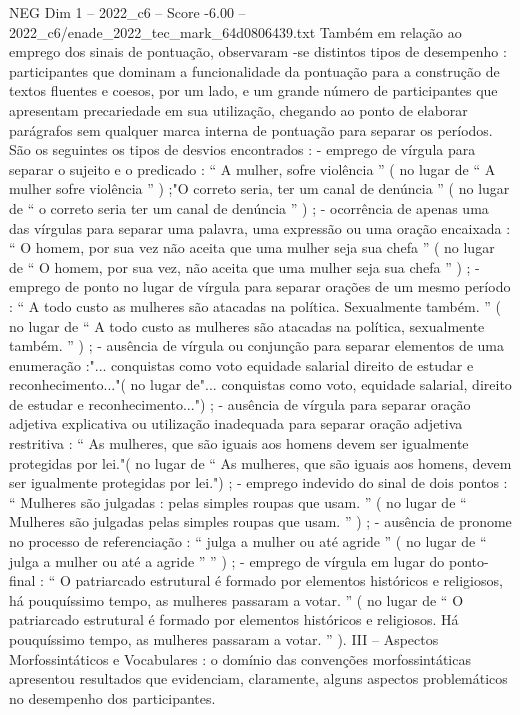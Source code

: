 \begin{textsample}{NEG Dim 1 – 2022\_c6 – Score -6.00 – 2022\_c6/enade\_2022\_tec\_mark\_64d0806439.txt}
Também em relação ao emprego dos sinais de pontuação, observaram -se distintos tipos de desempenho : participantes que dominam a funcionalidade da pontuação para a construção de textos fluentes e coesos, por um lado, e um grande número de participantes que apresentam precariedade em sua utilização, chegando ao ponto de elaborar parágrafos sem qualquer marca interna de pontuação para separar os períodos.
São os seguintes os tipos de desvios encontrados : - emprego de vírgula para separar o sujeito e o predicado : “ A mulher, sofre violência ” ( no lugar de “ A mulher sofre violência ” ) ;"O correto seria, ter um canal de denúncia ” ( no lugar de “ o correto seria ter um canal de denúncia ” ) ; - ocorrência de apenas uma das vírgulas para separar uma palavra, uma expressão ou uma oração encaixada : “ O homem, por sua vez não aceita que uma mulher seja sua chefa ” ( no lugar de “ O homem, por sua vez, não aceita que uma mulher seja sua chefa ” ) ; - emprego de ponto no lugar de vírgula para separar orações de um mesmo período : “ A todo custo as mulheres são atacadas na política.
Sexualmente também. ” ( no lugar de “ A todo custo as mulheres são atacadas na política, sexualmente também. ” ) ; - ausência de vírgula ou conjunção para separar elementos de uma enumeração :"... conquistas como voto equidade salarial direito de estudar e reconhecimento..."( no lugar de"... conquistas como voto, equidade salarial, direito de estudar e reconhecimento...") ; - ausência de vírgula para separar oração adjetiva explicativa ou utilização inadequada para separar oração adjetiva restritiva : “ As mulheres, que são iguais aos homens devem ser igualmente protegidas por lei."( no lugar de “ As mulheres, que são iguais aos homens, devem ser igualmente protegidas por lei.") ; - emprego indevido do sinal de dois pontos : “ Mulheres são julgadas : pelas simples roupas que usam. ” ( no lugar de “ Mulheres são julgadas pelas simples roupas que usam. ” ) ; - ausência de pronome no processo de referenciação : “ julga a mulher ou até agride ” ( no lugar de “ julga a mulher ou até a agride ” ” ) ; - emprego de vírgula em lugar do ponto-final : “ O patriarcado estrutural é formado por elementos históricos e religiosos, há pouquíssimo tempo, as mulheres passaram a votar. ” ( no lugar de “ O patriarcado estrutural é formado por elementos históricos e religiosos.
Há pouquíssimo tempo, as mulheres passaram a votar. ” ).
III – Aspectos Morfossintáticos e Vocabulares : o domínio das convenções morfossintáticas apresentou resultados que evidenciam, claramente, alguns aspectos problemáticos no desempenho dos participantes.

\end{textsample}
